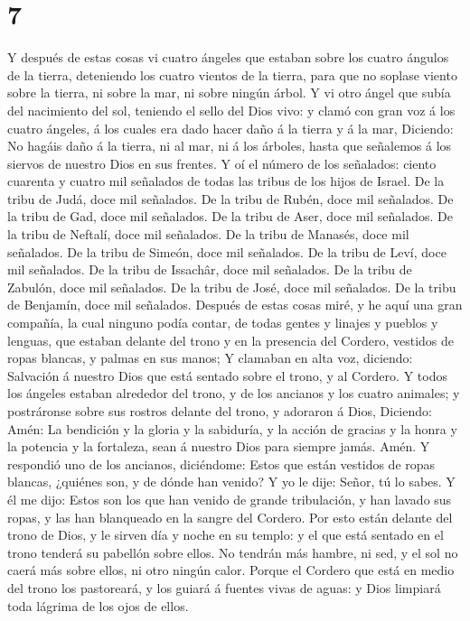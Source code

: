 \hypertarget{section-6}{%
\section{7}\label{section-6}}

 Y después de estas cosas vi cuatro ángeles que estaban
sobre los cuatro ángulos de la tierra, deteniendo los cuatro vientos de
la tierra, para que no soplase viento sobre la tierra, ni sobre la mar,
ni sobre ningún árbol.  Y vi otro ángel que subía del
nacimiento del sol, teniendo el sello del Dios vivo: y clamó con gran
voz á los cuatro ángeles, á los cuales era dado hacer daño á la tierra y
á la mar,  Diciendo: No hagáis daño á la tierra, ni al mar,
ni á los árboles, hasta que señalemos á los siervos de nuestro Dios en
sus frentes.  Y oí el número de los señalados: ciento
cuarenta y cuatro mil señalados de todas las tribus de los hijos de
Israel.  De la tribu de Judá, doce mil señalados. De la
tribu de Rubén, doce mil señalados. De la tribu de Gad, doce mil
señalados.  De la tribu de Aser, doce mil señalados. De la
tribu de Neftalí, doce mil señalados. De la tribu de Manasés, doce mil
señalados.  De la tribu de Simeón, doce mil señalados. De la
tribu de Leví, doce mil señalados. De la tribu de Issachâr, doce mil
señalados.  De la tribu de Zabulón, doce mil señalados. De
la tribu de José, doce mil señalados. De la tribu de Benjamín, doce mil
señalados.  Después de estas cosas miré, y he aquí una gran
compañía, la cual ninguno podía contar, de todas gentes y linajes y
pueblos y lenguas, que estaban delante del trono y en la presencia del
Cordero, vestidos de ropas blancas, y palmas en sus manos; 
Y clamaban en alta voz, diciendo: Salvación á nuestro Dios que está
sentado sobre el trono, y al Cordero.  Y todos los ángeles
estaban alrededor del trono, y de los ancianos y los cuatro animales; y
postráronse sobre sus rostros delante del trono, y adoraron á Dios,
 Diciendo: Amén: La bendición y la gloria y la sabiduría, y
la acción de gracias y la honra y la potencia y la fortaleza, sean á
nuestro Dios para siempre jamás. Amén.  Y respondió uno de
los ancianos, diciéndome: Estos que están vestidos de ropas blancas,
¿quiénes son, y de dónde han venido?  Y yo le dije: Señor,
tú lo sabes. Y él me dijo: Estos son los que han venido de grande
tribulación, y han lavado sus ropas, y las han blanqueado en la sangre
del Cordero.  Por esto están delante del trono de Dios, y
le sirven día y noche en su templo: y el que está sentado en el trono
tenderá su pabellón sobre ellos.  No tendrán más hambre, ni
sed, y el sol no caerá más sobre ellos, ni otro ningún calor.
 Porque el Cordero que está en medio del trono los
pastoreará, y los guiará á fuentes vivas de aguas: y Dios limpiará toda
lágrima de los ojos de ellos.

